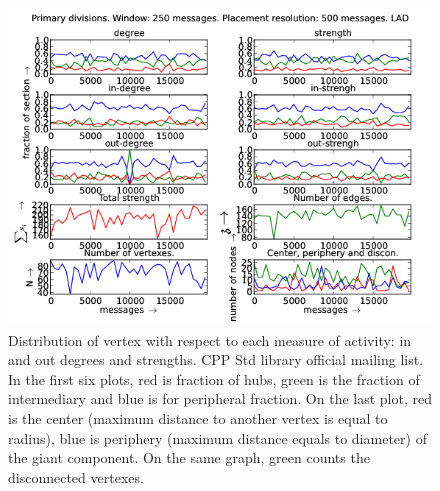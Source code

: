 \documentclass[%
 aip,
 jmp,%
 amsmath,amssymb,
 reprint,%
]{revtex4-1}
\begin{document}
\begin{figure}[hbtp] 
   \centering
        \includegraphics[width=\textwidth]{figs/LAD/250}
    \caption{Distribution of vertex with respect to each measure of activity: in and out degrees and strengths. CPP Std library official mailing list. In the first six plots, red is fraction of hubs, green is the fraction of intermediary and blue is for peripheral fraction. On the last plot, red is the center (maximum distance to another vertex is equal to radius), blue is periphery (maximum distance equals to diameter) of the giant component. On the same graph, green counts the disconnected vertexes.}
    \label{fig:lad250}
\end{figure}
\end{document}
